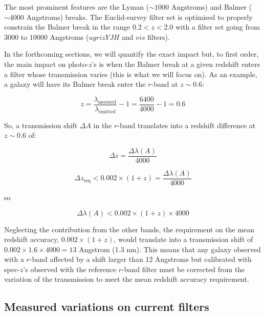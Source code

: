 \documentclass[11pt]{article}
\begin{document}
The most prominent features are the Lyman (\(\sim1000\) Angstroms) and
Balmer (\(\sim4000\) Angstroms) breaks. The Euclid-survey filter set is
optimised to properly constrain the Balmer break in the range
\(0.2<z<2.0\) with a filter set going from \(3000\) to \(10000\)
Angstroms (\(ugrizYJH\) and \(vis\) filters).

In the forthcoming sections, we will quantify the exact impact but, to
first order, the main impact on photo-\(z\)'s is when the Balmer break
at a given redshift enters a filter whose transmission varies (this is
what we will focus on). As an example, a galaxy will have its Balmer
break enter the \(r\)-band at \(z\sim0.6\):

    \begin{equation}
z = \frac{\lambda_\mathrm{ mesured}}{\lambda_\mathrm{ emitted}} - 1 = \frac{6400}{4000}-1 = 0.6
\end{equation}

    So, a transmission shift \(\Delta A\) in the \(r\)-band translates into
a redshift difference at \(z\sim0.6\) of:

    \begin{equation}
\Delta z = \frac{\Delta \lambda (A)}{4000}
\end{equation}

\begin{equation}
\Delta z_\mathrm{req} < 0.002\times(1+z) = \frac{\Delta \lambda(A)}{4000}
\end{equation}

so

\begin{equation}
\Delta \lambda(A) < 0.002\times(1+z)\times4000
\end{equation}

    Neglecting the contribution from the other bands, the requirement on the
mean redshift accuracy, \(0.002\times(1+z)\), would translate into a
transmission shift of \(0.002\times1.6\times4000=13\) Angstrom (1.3 nm).
This means that any galaxy observed with a \(r\)-band affected by a
shift larger than 12 Angstroms but calibrated with spec-\(z\)'s observed
with the reference \(r\)-band filter must be corrected from the
variation of the transmission to meet the mean redshift accuracy
requirement.

\subsection{Measured variations on current
filters}\label{measured-variations-on-current-filters}
\end{document}
